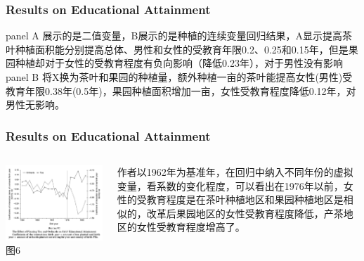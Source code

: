 \documentclass{beamer}
\begin{document}
\begin{frame}
    \frametitle{Results on Educational Attainment}
panel A 展示的是二值变量，B展示的是种植的连续变量回归结果，A显示提高茶叶种植面积能分别提高总体、男性和女性的受教育年限0.2、0.25和0.15年，但是果园种植却对于女性的受教育程度有负向影响（降低0.23年），对于男性没有影响
\\panel B 将X换为茶叶和果园的种植量，额外种植一亩的茶叶能提高女性(男性)受教育年限0.38年(0.5年)，果园种植面积增加一亩，女性受教育程度降低0.12年，对男性无影响。
\end{frame}

\begin{frame}
    \frametitle{Results on Educational Attainment}
    \begin{columns}
            \begin{minipage}[c][0.4\textheight][c]{\linewidth}
                \centering
                \includegraphics[scale=0.3]{figure6}
                图6
            \end{minipage}
            \begin{minipage}[c][0.4\textheight][c]{\linewidth}
            作者以1962年为基准年，在回归中纳入不同年份的虚拟变量，看系数的变化程度，可以看出在1976年以前，女性的受教育程度是在茶叶种植地区和果园种植地区是相似的，改革后果园地区的女性受教育程度降低，产茶地区的女性受教育程度增高了。
            \end{minipage}
    \end{columns} 
\end{frame}
\end{document}
